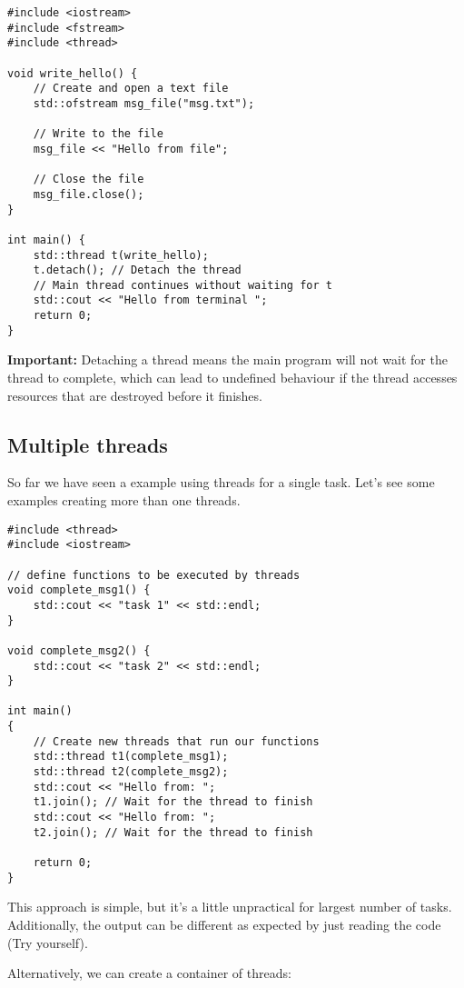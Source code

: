 \documentclass{article}
\begin{document}
\begin{verbatim}
#include <iostream>
#include <fstream>
#include <thread>

void write_hello() {
    // Create and open a text file
    std::ofstream msg_file("msg.txt");

    // Write to the file
    msg_file << "Hello from file";

    // Close the file
    msg_file.close();
}

int main() {
    std::thread t(write_hello);
    t.detach(); // Detach the thread
    // Main thread continues without waiting for t
    std::cout << "Hello from terminal ";
    return 0;
}
\end{verbatim}

\textbf{Important:} Detaching a thread means the main program will not wait for the thread to complete, which can lead to undefined behaviour if the thread accesses resources that are destroyed before it finishes.

\subsection{Multiple threads}
So far we have seen a example using threads for a single task. Let's see some examples creating more than one threads.

\begin{verbatim}
#include <thread>
#include <iostream>

// define functions to be executed by threads
void complete_msg1() {
   	std::cout << "task 1" << std::endl;
}

void complete_msg2() {
   	std::cout << "task 2" << std::endl;
}

int main()
{
	// Create new threads that run our functions
    std::thread t1(complete_msg1);
    std::thread t2(complete_msg2);
    std::cout << "Hello from: ";
    t1.join(); // Wait for the thread to finish
    std::cout << "Hello from: ";
    t2.join(); // Wait for the thread to finish
    
    return 0;
}
\end{verbatim}

This approach is simple, but it's a little unpractical for largest number of tasks. Additionally, the output can be different as expected by just reading the code (Try yourself).

Alternatively, we can create a container of threads:
\end{document}
